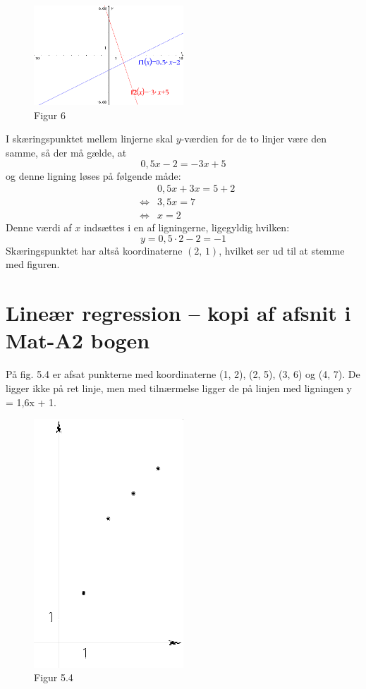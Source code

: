 \documentclass[12pt,oneside,a4paper]{article}
\newcommand{\bas}{\begin{eqnarray*}}
\newcommand{\eas}{\end{eqnarray*}}
\begin{document}
\begin{figure}[ht]
    \centering
    \includegraphics[width=0.5\textwidth]{fig6}
    \caption{Figur 6}
    \label{fig6}
\end{figure}

I skæringspunktet mellem linjerne skal $y$-værdien for de to linjer være den
samme, så der må gælde, at
$$
0,5x-2 = -3x+5
$$
og denne ligning løses på følgende måde:
\bas
&& 0,5x+3x=5+2\\
&\iff& 3,5x=7\\
&\iff& x=2
\eas
Denne værdi af $x$ indsættes i en af ligningerne, ligegyldig hvilken:
$$
y=0,5\cdot2-2=-1
$$
Skæringspunktet har altså koordinaterne $(2,\,1)$, hvilket ser ud til at
stemme med figuren.

\section{Lineær regression -- kopi af afsnit i Mat-A2 bogen}
På fig. 5.4 er afsat punkterne med koordinaterne (1, 2), (2, 5), (3, 6) og (4,
7). De ligger ikke på ret linje, men med tilnærmelse ligger de på linjen med
ligningen y = 1,6x + 1.

\begin{figure}[ht]
    \centering
    \includegraphics[width=0.5\textwidth]{fig54}
    \caption{Figur 5.4}
    \label{fig54}
\end{figure}
\end{document}

